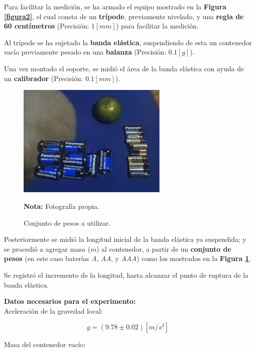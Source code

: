 \documentclass[letter,11pt]{article}
\newcommand{\source}[1]{\vspace{-11pt} \caption*{\small{\textbf{Nota:} {#1}}}}
\begin{document}
Para facilitar la medición, se ha armado el equipo mostrado en la
\textbf{Figura \ref{figura2}}, el cual consta de un \textbf{trípode},
previamente nivelado, y una \textbf{regla de 60 centímetros} (Precisión:
$1 [mm]$) para facilitar la medición.

Al trípode se ha sujetado la \textbf{banda elástica}, suspendiendo de esta un
contenedor vacío previamente pesado en una \textbf{balanza} (Precisión:
$0.1 [g]$).

Una vez montado el soporte, se midió el área de la banda elástica con ayuda de
un \textbf{calibrador} (Precisión: $0.1 [mm]$).

\begin{figure}
\centering
\includegraphics[width=0.65\textwidth]{resources/f2.eps}
\caption{Conjunto de pesos a utilizar.}
\label{figura3}
\source{Fotografía propia.}
\end{figure}

Posteriormente se midió la longitud inicial de la banda elástica ya suspendida;
y se procedió a agregar masa ($m$) al contenedor, a partir de un
\textbf{conjunto de pesos} (en este caso baterías \emph{A}, \emph{AA}, y
\emph{AAA}) como los mostrados en la \textbf{Figura \ref{figura3}}.

Se registró el incremento de la longitud, hasta alcanzar el punto de ruptura de
la banda elástica.

\vspace{0.35cm}
\textbf{Datos necesarios para el experimento:} \\

Aceleración de la gravedad local:

\begin{equation*}
    g = (9.78 \pm 0.02)[m/s^2]
\end{equation*}
\vspace{0.10cm}

Masa del contenedor vacío:
\end{document}

